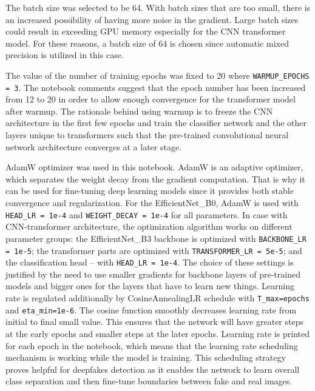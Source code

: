 \documentclass[12pt,a4paper]{report}
\begin{document}
The batch size was selected to be 64. With batch sizes that are too small, there is an increased possibility of having more noise in the gradient. Large batch sizes could result in exceeding GPU memory especially for the CNN transformer model. For these reasons, a batch size of 64 is chosen since automatic mixed precision is utilized in this case.

The value of the number of training epochs was fixed to 20 where \texttt{WARMUP\_EPOCHS = 3}. The notebook comments suggest that the epoch number has been increased from 12 to 20 in order to allow enough convergence for the transformer model after warmup. The rationale behind using warmup is to freeze the CNN architecture in the first few epochs and train the classifier network and the other layers unique to transformers such that the pre-trained convolutional neural network architecture converges at a later stage.

AdamW optimizer was used in this notebook. AdamW is an adaptive optimizer, which separates the weight decay from the gradient computation. That is why it can be used for fine-tuning deep learning models since it provides both stable convergence and regularization. For the EfficientNet\_B0, AdamW is used with \texttt{HEAD\_LR = 1e-4} and \texttt{WEIGHT\_DECAY = 1e-4} for all parameters. In case with CNN-transformer architecture, the optimization algorithm works on different parameter groups: the EfficientNet\_B3 backbone is optimized with \texttt{BACKBONE\_LR = 1e-5}; the transformer parts are optimized with \texttt{TRANSFORMER\_LR = 5e-5}; and the classification head – with \texttt{HEAD\_LR = 1e-4}. The choice of these settings is justified by the need to use smaller gradients for backbone layers of pre-trained models and bigger ones for the layers that have to learn new things.
Learning rate is regulated additionally by CosineAnnealingLR schedule with \texttt{T\_max=epochs} and \texttt{eta\_min=1e-6}. The cosine function smoothly decreases learning rate from initial to final small value. This ensures that the network will have greater steps at the early epochs and smaller steps at the later epochs. Learning rate is printed for each epoch in the notebook, which means that the learning rate scheduling mechanism is working while the model is training. This scheduling strategy proves helpful for deepfakes detection as it enables the network to learn overall class separation and then fine-tune boundaries between fake and real images.
\end{document}
